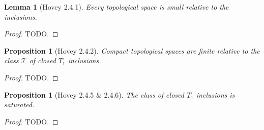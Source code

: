 \documentclass{amsart}
\theoremstyle{plain}
\newtheorem{proposition}[theorem]{Proposition}
\newtheorem{lemma}[theorem]{Lemma}
\theoremstyle{definition}
\newcommand{\0}{\mathbf{0}}
\newcommand{\cT}{\mathcal T}
\renewcommand{\(}{\left(}
\renewcommand{\)}{\right)}
\begin{document}
\begin{lemma}[Hovey 2.4.1]\label{2.4.1}
  Every topological space is small relative to the inclusions.
\end{lemma}
\begin{proof}
  \color{red}TODO.
\end{proof}

\begin{proposition}[Hovey 2.4.2]\label{2.4.2}
  Compact topological spaces are finite relative to the class $\cT$ of closed $T_1$ inclusions.
\end{proposition}
\begin{proof}
  \color{red}TODO.
\end{proof}

\begin{proposition}[Hovey 2.4.5 \& 2.4.6]\label{2.4.5-6}
  The class of closed $T_1$ inclusions is saturated.
\end{proposition}
\begin{proof}
  \color{red}TODO.
\end{proof}
\end{document}
